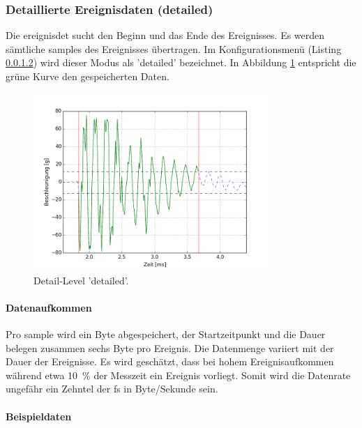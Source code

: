 \subsubsection{Detaillierte Ereignisdaten (detailed)}
Die \gls{ereignisdet} sucht den Beginn und das Ende des Ereignisses. Es werden sämtliche \glspl{sample} des Ereignisses übertragen. Im Konfigurationsmenü (Listing \ref{}) wird dieser Modus als 'detailed' bezeichnet. In Abbildung \ref{fig.detaildetailed} entspricht die grüne Kurve den gespeicherten Daten.

\begin{figure}
	\centering
		\includegraphics[width=0.8\textwidth]{images/detailed.png}
	\caption{Detail-Level 'detailed'.}
	\label{fig.detaildetailed}
\end{figure}

\paragraph{Datenaufkommen} Pro \gls{sample} wird ein Byte abgespeichert, der Startzeitpunkt und die Dauer belegen zusammen sechs Byte pro Ereignis. Die Datenmenge variiert mit der Dauer der Ereignisse. Es wird geschätzt, dass bei hohem Ereignisaufkommen während etwa 10~\% der Messzeit ein Ereignis vorliegt. Somit wird die Datenrate ungefähr ein Zehntel der \gls{fs} in Byte/Sekunde sein.

\paragraph{Beispieldaten} 

